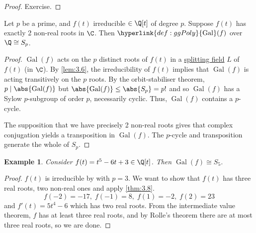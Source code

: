 \documentclass{article}
\DeclareMathOperator{\Gal}{Gal}
\newtheorem{nexample}[nthm]{Example}
\begin{document}
\begin{proof}
    Exercise.
\end{proof}

\begin{nthm}\label{thm:3.8}
    Let $p$ be a prime, and $f(t)$ irreducible $\in \Q[t]$ of degree $p$.
    Suppose $f(t)$ has exactly 2 non-real roots in $\C$.
    Then $\hyperlink{def:ggPoly}{\Gal}(f)$ over $\Q \cong S_p$.
\end{nthm}

\begin{proof}
    $\Gal(f)$ acts on the $p$ distinct roots of $f(t)$ in a \hyperlink{def:splitting}{splitting field} $L$ of $f(t)$ (in $\C$).
    By \cref{lem:3.6}, the irreducibility of $f(t)$ implies that $\Gal(f)$ is acting transitively on the $p$ roots.
    By the orbit-stabiliser theorem, $p \mid \abs{\Gal(f)}$ but $\abs{\Gal(f)} \leq \abs{S_p} = p!$ and so $\Gal(f)$ has a Sylow $p$-subgroup of order $p$, necessarily cyclic.
    Thus, $\Gal(f)$ contains a $p$-cycle.

    The supposition that we have precisely 2 non-real roots gives that complex conjugation yields a transposition in $\Gal(f)$.
    The $p$-cycle and transposition generate the whole of $S_p$.
\end{proof}

\begin{nexample}\label{eg:3.9}
    Consider $f(t) = t^5 - 6t + 3 \in \Q[t]$. Then $\Gal(f) \cong S_5$.
\end{nexample}

\begin{proof}
    $f(t)$ is irreducible by  with $p=3$.
    We want to show that $f(t)$ has three real roots, two non-real ones and apply \cref{thm:3.8}.
    \begin{equation*}
        f(-2) = -17, \; f(-1) = 8, \; f(1) = -2, \; f(2) = 23
    \end{equation*}
    and $f'(t) = 5t^4 - 6$ which has two real roots.
    From the intermediate value theorem, $f$ has at least three real roots, and by Rolle's theorem there are at most three real roots, so we are done.
\end{proof}

\end{document}
